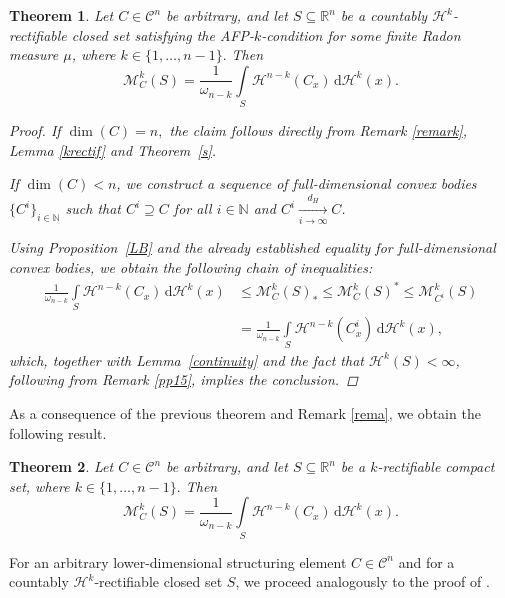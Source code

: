 \documentclass[pdflatex,sn-mathphys-num]{sn-jnl}
\theoremstyle{plain}
\newtheorem{theorem}{Theorem}[section]
\theoremstyle{definition}
\newcommand{\dH}[1]{\,\mathrm d\mathcal{H}^{#1}}
\begin{document}
\begin{theorem}\label{sq}
    Let $C\in\mathcal{C}^{n}$ be arbitrary, and let $S\subseteq\mathbb{R}^n$ be a countably $\mathcal{H}^k$-rectifiable closed set satisfying the AFP-$k$-condition for some finite Radon measure $\mu$, where $k\in\{1, \dots, n-1\}.$ Then $$\mathcal{M}^k_{C}(S)=\frac{1}{\omega_{n-k}}
            \int\limits_{S}\mathcal{H}^{n-k}(C_x)\dH{k}(x).$$
    \begin{proof}
        If $\dim(C)=n,$ the claim follows directly from Remark \ref{remark}, Lemma \ref{krectif} and Theorem~\ref{s}.
        
If $\dim(C)<n$, we construct a sequence of full-dimensional convex bodies 
$\{C^i\}_{i\in\mathbb{N}}$ such that $C^i \supseteq C$ for all $i\in\mathbb{N}$ and 
$C^i \xrightarrow[i\to\infty]{d_H} C$.

Using Proposition~\ref{LB} and the already established equality for full-dimensional 
convex bodies, we obtain the following chain of inequalities:
\begin{equation*}
    \begin{split}
        \frac{1}{\omega_{n-k}}
            \int\limits_{S}\mathcal{H}^{n-k}(C_x)\dH{k}(x)
        &\leq \mathcal{M}^k_C(S)_*
        \leq \mathcal{M}^k_C(S)^*
        \leq \mathcal{M}^k_{C^i}(S)\\&= \frac{1}{\omega_{n-k}}
            \int\limits_{S}\mathcal{H}^{n-k}(C^i_x)\dH{k}(x),
    \end{split}
\end{equation*}
which, together with Lemma~\ref{continuity} and the fact that $\mathcal{H}^k(S)<\infty$, following from Remark \ref{pp15}, implies the conclusion.
    \end{proof}
\end{theorem}
 
As a consequence of the previous theorem and Remark \ref{rema}, we obtain the following result.
\begin{theorem}
    Let $C\in\mathcal{C}^n$ be arbitrary, and let $S\subseteq\mathbb{R}^n$ be a $k$-rectifiable compact set, where $k\in\{1, \dots, n-1\}.$ Then $$\mathcal{M}^k_{C}(S)=\frac{1}{\omega_{n-k}}
            \int\limits_{S}\mathcal{H}^{n-k}(C_x)\dH{k}(x).$$
\end{theorem}

\medskip

For an arbitrary lower-dimensional structuring element $C\in\mathcal{C}^n$ and for a countably $\mathcal{H}^k$-rectifiable closed set $S$, we proceed analogously to the proof of \cite[Theorem 8]{Rataj5}. 
\end{document}
